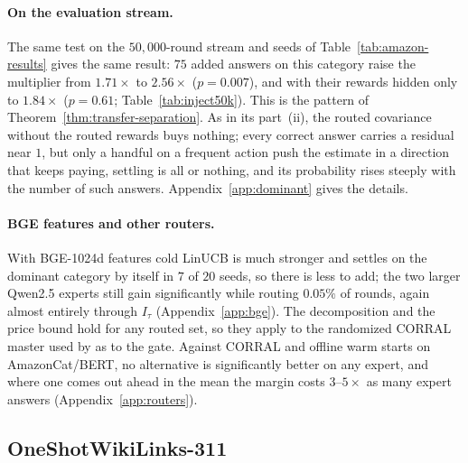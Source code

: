 \documentclass[anon]{alt2027} %
\begin{document}
\paragraph{On the evaluation stream.} The same test on the $50{,}000$-round
stream and seeds of Table~\ref{tab:amazon-results} gives the same result:
$75$ added answers on this category raise the multiplier from $1.71\times$ to
$2.56\times$ ($p=0.007$), and with their rewards hidden only to $1.84\times$
($p=0.61$; Table~\ref{tab:inject50k}). This is the pattern of
Theorem~\ref{thm:transfer-separation}. As in its part~(ii), the routed
covariance without the routed rewards buys nothing; every correct answer
carries a residual near $1$, but only a handful on a frequent action push the
estimate in a direction that keeps paying, settling is all or nothing, and
its probability rises steeply with the number of such answers.
Appendix~\ref{app:dominant} gives the details.

\paragraph{BGE features and other routers.}
With BGE-1024d features cold LinUCB is much stronger and settles on the
dominant category by itself in $7$ of $20$ seeds, so there is less to add; the
two larger Qwen2.5 experts still gain significantly while routing $0.05\%$ of
rounds, again almost entirely through $I_\tau$ (Appendix~\ref{app:bge}). The
decomposition and the price bound hold for any routed set, so they apply to
the randomized CORRAL master \citep{agarwal2017corralling} used by
\citet{chen2024llmdecision} as to the gate. Against CORRAL and offline warm
starts on AmazonCat/BERT, no alternative is significantly better on any
expert, and where one comes out ahead in the mean the margin costs $3$--$5\times$
as many expert answers (Appendix~\ref{app:routers}).

\subsection{OneShotWikiLinks-311}
\label{sec:wiki}
\end{document}

